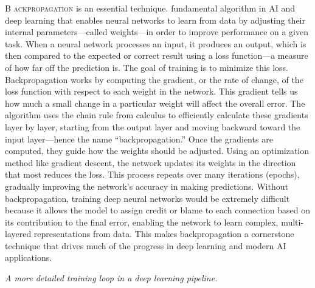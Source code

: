 \documentclass{book}
\begin{document}
\lettrine{B}{ ackpropagation} is an essential technique. fundamental algorithm in AI and deep learning that enables neural networks to learn from data by adjusting their internal parameters—called weights—in order to improve performance on a given task. When a neural network processes an input, it produces an output, which is then compared to the expected or correct result using a loss function—a measure of how far off the prediction is. The goal of training is to minimize this loss.
Backpropagation works by computing the gradient, or the rate of change, of the loss function with respect to each weight in the network. This gradient tells us how much a small change in a particular weight will affect the overall error. The algorithm uses the chain rule from calculus to efficiently calculate these gradients layer by layer, starting from the output layer and moving backward toward the input layer—hence the name “backpropagation.”
Once the gradients are computed, they guide how the weights should be adjusted. Using an optimization method like gradient descent, the network updates its weights in the direction that most reduces the loss. This process repeats over many iterations (epochs), gradually improving the network’s accuracy in making predictions.
Without backpropagation, training deep neural networks would be extremely difficult because it allows the model to assign credit or blame to each connection based on its contribution to the final error, enabling the network to learn complex, multi-layered representations from data. This makes backpropagation a cornerstone technique that drives much of the progress in deep learning and modern AI applications.

\begin{center}

\vspace{0.5cm}
{\itshape A more detailed training loop in a deep learning pipeline.}
\end{center}
\end{document}

